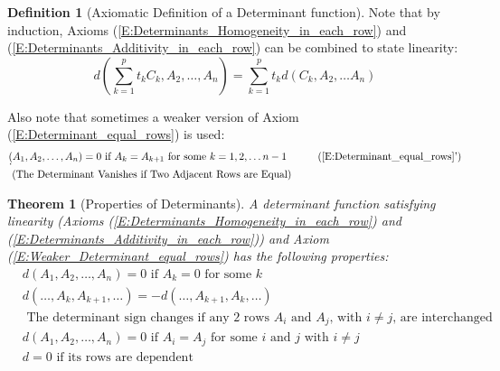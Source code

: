\documentclass[twoside]{amsart}
\theoremstyle{plain}
\newtheorem{theorem}{Theorem}
\theoremstyle{definition}
\newtheorem{definition}{Definition}
\begin{document}
\begin{definition}[Axiomatic Definition of a Determinant function]
Note that by induction, Axioms (\ref{E:Determinants_Homogeneity_in_each_row}) and (\ref{E:Determinants_Additivity_in_each_row}) can be combined to state linearity:
\begin{equation}\label{E:Determinants_linearity}
d(\sum_{k=1}^p t_k C_k, A_2, \dots , A_n ) = \sum_{k=1}^p t_k d(C_k , A_2, \dots A_n)
\end{equation}

Also note that sometimes a weaker version of Axiom (\ref{E:Determinant_equal_rows}) is used: 
\begin{align}
  &\d(A_1,A_2, \dots, A_n) = 0 \text{ if } A_k = A_{k+1} \text{ for some } k = 1,2, \dots n-1 \quad  \tag{\ref{E:Determinant_equal_rows}'} \label{E:Weaker_Determinant_equal_rows} \\
  &\text{ (The Determinant Vanishes if Two Adjacent Rows are Equal) } \notag 
\end{align}
\end{definition}

\begin{theorem}[Properties of Determinants]\label{T:Determinant_Properties}
A determinant function satisfying linearity (Axioms (\ref{E:Determinants_Homogeneity_in_each_row}) and (\ref{E:Determinants_Additivity_in_each_row})) and Axiom (\ref{E:Weaker_Determinant_equal_rows}) has the following properties:
\begin{align}
  & d(A_1 , A_2 , \dots , A_n ) = 0 \text{ if } A_k = 0 \text{ for some } k \label{E:Det_Prop_0_row} \\
  & d(\dots, A_k , A_{k+1} , \dots ) = - d( \dots , A_{k+1} , A_k , \dots ) \label{E:Det_Prop_interchange_adjacent_rows} \\
  & \text{ The determinant sign changes if any 2 rows $A_i$ and $A_j$, with $i\neq j$, are interchanged } \label{E:Det_Prop_interchange_any_rows} \\
  & d(A_1 , A_2 , \dots , A_n) = 0 \text{ if } A_i = A_j \text{ for some $i$ and $j$ with $i\neq j$ } \label{E:Det_Prop_equal_rows} \\
  & d = 0 \text{ if its rows are dependent } \label{E:Det_Prop_dependent_rows}
\end{align}
\end{theorem}
\end{document}
